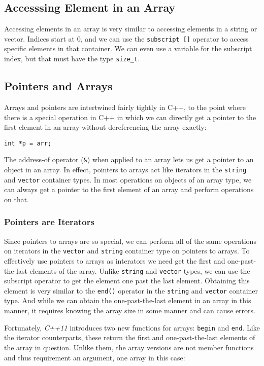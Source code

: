 \documentclass[12pt, a4paper]{report}
\begin{document}
\subsection{Accesssing Element in an Array}
Accessing elements in an array is very similar to accessing elements in a string or vector.
Indices start at 0, and we can use the \verb|subscript []| operator to access specific elements in that container.
We can even use a variable for the subscript index, but that must have the type \verb|size_t|.
\subsection{Pointers and Arrays}
Arrays and pointers are intertwined fairly tightly in C++, to the point where there is a special operation in C++ in which we can directly get a pointer to the first element in an array without dereferencing the array exactly:

\verb|int *p = arr;|

The address-of operator (\verb|&|) when applied to an array lets us get a pointer to an object in an array.
In effect, pointers to arrays act like iterators in the \verb|string| and \verb|vector| container types.
In most operations on objects of an array type, we can always get a pointer to the first element of an array and perform operations on that.
\subsubsection{Pointers are Iterators}
Since pointers to arrays are so special, we can perform all of the same operations on iterators in the \verb|vector| and \verb|string| container type on pointers to arrays.
To effectively use pointers to arrays as interators we need get the first and one-past-the-last elements of the array.
Unlike \verb|string| and \verb|vector| types, we can use the subscript operator to get the element one past the last element.
Obtaining this element is very similar to the \verb|end()| operator in the \verb|string| and \verb|vector| container type.
And while we can obtain the one-past-the-last element in an array in this manner, it requires knowing the array size in some manner and can cause errors.

Fortunately, \emph{C++11} introduces two new functions for arrays: \verb|begin| and \verb|end|.
Like the iterator counterparts, these return the first and one-past-the-last elements of the array in question.
Unlike them, the array versions are not member functions and thus requirement an argument, one array in this case:
\end{document}
